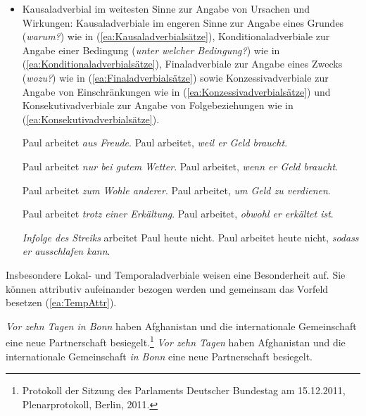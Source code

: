 \begin{itemize}
\item Kausaladverbial im weitesten Sinne zur Angabe von Ursachen und Wirkungen: Kausaladverbiale im engeren Sinne zur Angabe eines Grundes (\textit{warum?}) wie in (\ref{ea:Kausaladverbialsätze}), Konditionaladverbiale zur Angabe einer Bedingung (\textit{unter welcher Bedingung?}) wie in (\ref{ea:Konditionaladverbialsätze}), Finaladverbiale zur Angabe eines Zwecks (\textit{wozu?}) wie in (\ref{ea:Finaladverbialsätze}) sowie Konzessivadverbiale zur Angabe von Einschränkungen wie in (\ref{ea:Konzessivadverbialsätze}) und Konsekutivadverbiale zur Angabe von Folgebeziehungen wie in (\ref{ea:Konsekutivadverbialsätze}).   

\ea \label{ea:Kausaladverbialsätze}
\ea \label{ea:Kausaladverbial} Paul arbeitet \textit{aus Freude}. 
\ex \label{ex:Kausaladverbial2} Paul arbeitet, \textit{weil er Geld braucht}. 
\z
\z 

\ea \label{ea:Konditionaladverbialsätze}
\ea \label{ea:Kausaladverbial3} Paul arbeitet \textit{nur bei gutem Wetter}.
\ex \label{ex:Kausaladverbial4} Paul arbeitet, \textit{wenn er Geld braucht}. 
\z 
\z 

\ea \label{ea:Finaladverbialsätze}
\ea \label{ea:Kausaladverbial5} Paul arbeitet \textit{zum Wohle anderer}.
\ex \label{ex:Kausaladverbial6} Paul arbeitet, \textit{um Geld zu verdienen}. 
\z 
\z 

\ea \label{ea:Konzessivadverbialsätze}
\ea \label{ea:Kausaladverbial7} Paul arbeitet \textit{trotz einer Erkältung}. 
\ex \label{ex:Kausaladverbial8} Paul arbeitet, \textit{obwohl er erkältet ist}. 
\z 
\z 

\newpage
\ea \label{ea:Konsekutivadverbialsätze}
\ea \label{ea:Kausaladverbial9} \textit{Infolge des Streiks} arbeitet Paul heute nicht.  
\ex \label{ex:Kausaladverbial0} Paul arbeitet heute nicht, \textit{sodass er ausschlafen kann}. 
\z 
\z 

\end{itemize}


Insbesondere Lokal- und Temporaladverbiale weisen eine Besonderheit auf. Sie können attributiv aufeinander bezogen werden und gemeinsam das Vorfeld besetzen (\ref{ea:TempAttr}). 

\ea \label{ea:AdvAttr}
\ea \label{ea:TempAttr} \textit{Vor zehn Tagen in Bonn} haben Afghanistan und die internationale Gemeinschaft eine neue Partnerschaft besiegelt.\footnote{Protokoll der Sitzung des Parlaments Deutscher Bundestag am 15.12.2011, Plenarprotokoll, Berlin, 2011.}
\ex \label{ex:TempAdv} \textit{Vor zehn Tagen} haben Afghanistan und die internationale Gemeinschaft \textit{in Bonn} eine neue Partnerschaft besiegelt.
\z 
\z 

